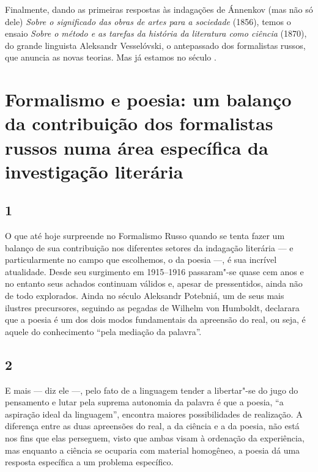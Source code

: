 Finalmente, dando as primeiras respostas às indagações de Ánnenkov (mas
não só dele) \emph{Sobre o significado das obras de artes para a sociedade}
(1856), temos o ensaio \emph{Sobre o método e as tarefas da história da
literatura como ciência} (1870), do grande linguista Aleksandr
Vesselóvski, o antepassado dos formalistas russos, que anuncia as novas
teorias. Mas já estamos no século .

\chapter*{Formalismo e poesia: um balanço da contribuição dos formalistas russos numa
área específica da investigação literária}



\section{1}

O que até hoje surpreende no Formalismo Russo quando se tenta fazer um
balanço de sua contribuição nos diferentes setores da indagação
literária --- e particularmente no campo que escolhemos, o da poesia ---,
é sua incrível atualidade. Desde seu surgimento em 1915--1916 passaram"-se
quase cem anos e no entanto seus achados continuam válidos e, apesar de
pressentidos, ainda não de todo explorados. Ainda no século  Aleksandr
Potebniá, um de seus mais ilustres precursores, seguindo as pegadas de
Wilhelm von Humboldt, declarara que a poesia é um dos dois modos
fundamentais da apreensão do real, ou seja, é aquele do conhecimento
``pela mediação da palavra''.

\section{2}

E mais --- diz ele ---, pelo fato de a linguagem tender a libertar"-se do
jugo do pensamento e lutar pela suprema autonomia da palavra é que a
poesia, ``a aspiração ideal da linguagem'', encontra maiores
possibilidades de realização. A diferença entre as duas apreensões do
real, a da ciência e a da poesia, não está nos fins que elas perseguem,
visto que ambas visam à ordenação da experiência, mas enquanto a ciência
se ocuparia com material homogêneo, a poesia dá uma resposta específica
a um problema específico.

